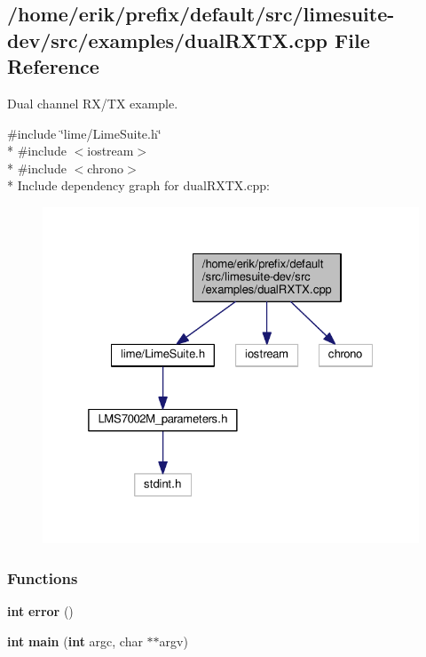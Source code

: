 \subsection{/home/erik/prefix/default/src/limesuite-\/dev/src/examples/dual\+R\+X\+TX.cpp File Reference}
\label{dualRXTX_8cpp}


Dual channel R\+X/\+TX example.  


{\ttfamily \#include \char`\"{}lime/\+Lime\+Suite.\+h\char`\"{}}\\*
{\ttfamily \#include $<$iostream$>$}\\*
{\ttfamily \#include $<$chrono$>$}\\*
Include dependency graph for dual\+R\+X\+T\+X.\+cpp\+:
\nopagebreak
\begin{figure}[H]
\begin{center}
\leavevmode
\includegraphics[width=325pt]{de/d6a/dualRXTX_8cpp__incl}
\end{center}
\end{figure}
\subsubsection*{Functions}
\begin{DoxyCompactItemize}
\item 
{\bf int} {\bf error} ()
\item 
{\bf int} {\bf main} ({\bf int} argc, char $\ast$$\ast$argv)
\end{DoxyCompactItemize}
